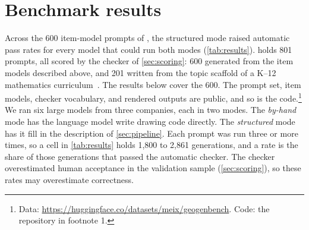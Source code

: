 \section{Benchmark results}
\label{sec:benchmark}

Across the 600 item-model prompts of \GeoGenBench, the structured mode raised automatic pass rates for every model that could run both modes (\cref{tab:results}). \GeoGenBench holds 801 prompts, all scored by the checker of \cref{sec:scoring}: 600 generated from the item models described above, and 201 written from the topic scaffold of a K--12 mathematics curriculum~\citep{bluebonnet2024}. The results below cover the 600. The prompt set, item models, checker vocabulary, and rendered outputs are public, and so is the code.\footnote{Data: \url{https://huggingface.co/datasets/meix/geogenbench}. Code: the repository in footnote 1.} We ran six large models from three companies, each in two modes. The \emph{by-hand} mode has the language model write drawing code directly. The \emph{structured} mode has it fill in the description of \cref{sec:pipeline}. Each prompt was run three or more times, so a cell in \cref{tab:results} holds 1,800 to 2,861 generations, and a rate is the share of those generations that passed the automatic checker. The checker overestimated human acceptance in the validation sample (\cref{sec:scoring}), so these rates may overestimate correctness.


